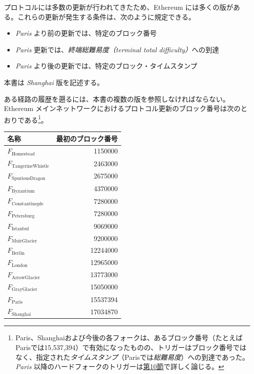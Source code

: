 \documentclass[
]{ltjsarticle}
\begin{document}
プロトコルには多数の更新が行われてきたため、Ethereum
には多くの版がある。これらの更新が発生する条件は、次のように規定できる。

\begin{itemize}
\item
  \emph{Paris} より前の更新では、特定のブロック番号
\item
  \emph{Paris} 更新では、\emph{終端総難易度（terminal total
  difficulty）}への到達
\item
  \emph{Paris} より後の更新では、特定のブロック・タイムスタンプ
\end{itemize}

本書は \emph{Shanghai} 版を記述する。

ある経路の履歴を遡るには、本書の複数の版を参照しなければならない。Ethereum
メインネットワークにおけるプロトコル更新のブロック番号は次のとおりである\footnote{Paris、Shanghaiおよび今後の各フォークは、あるブロック番号（たとえばParisでは15,537,394）で有効になったものの、トリガーはブロック番号ではなく、指定された\emph{タイムスタンプ}（Parisでは\emph{総難易度}）への到達であった。\emph{Paris}
  以降のハードフォークのトリガーは\protect\hyperlink{ch:pos_transition}{第10節}で詳しく論じる。}。

\begin{longtable}[]{@{}lr@{}}
\toprule\noalign{}
名称 & 最初のブロック番号 \\
\midrule\noalign{}
\endhead
\bottomrule\noalign{}
\endlastfoot
\(F_{\mathrm{Homestead}}\) & 1150000 \\
\(F_{\mathrm{Tangerine Whistle}}\) & 2463000 \\
\(F_{\mathrm{Spurious Dragon}}\) & 2675000 \\
\(F_{\mathrm{Byzantium}}\) & 4370000 \\
\(F_{\mathrm{Constantinople}}\) & 7280000 \\
\(F_{\mathrm{Petersburg}}\) & 7280000 \\
\(F_{\mathrm{Istanbul}}\) & 9069000 \\
\(F_{\mathrm{Muir Glacier}}\) & 9200000 \\
\(F_{\mathrm{Berlin}}\) & 12244000 \\
\(F_{\mathrm{London}}\) & 12965000 \\
\(F_{\mathrm{Arrow Glacier}}\) & 13773000 \\
\(F_{\mathrm{Gray Glacier}}\) & 15050000 \\
\(F_{\mathrm{Paris}}\) & 15537394 \\
\(F_{\mathrm{Shanghai}}\) & 17034870 \\
\end{longtable}
\end{document}
